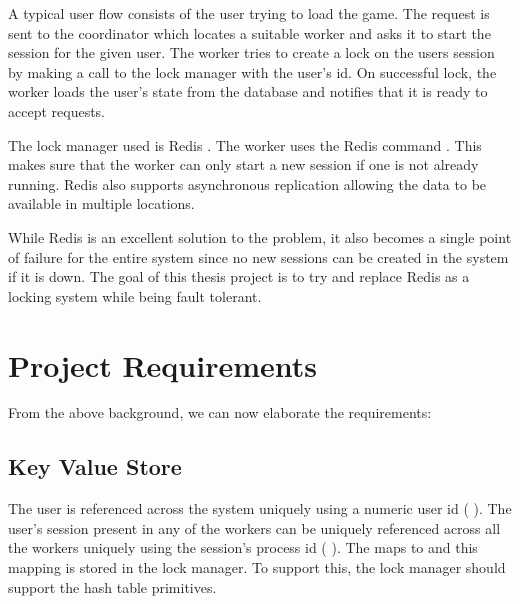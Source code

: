 A typical user flow consists of the user trying to load the game. The request
is sent to the coordinator which locates a suitable worker and asks it to
start the session for the given user. The worker tries to create a lock on
the users session by making a call to the lock manager with the user's id.
On successful lock, the worker loads the user's state from the database and
notifies that it is ready to accept requests.

The lock manager used is Redis \citep{redis}%
. The worker uses the Redis command %
. This makes sure that the worker can only start a new session if one is
not already running. Redis also supports asynchronous replication allowing the
data to be available in multiple locations.

While Redis is an excellent solution to the problem, it also becomes a single
point of failure for the entire system since no new sessions can be created in
the system if it is down. The goal of this thesis project is to try and replace
Redis as a locking system while being fault tolerant.

\section{Project Requirements}

From the above background, we can now elaborate the requirements:

\subsection{Key Value Store}
\label{section:ml.kv.store}


The user is referenced across the system uniquely using a numeric user id
(%
). The user's session present in any of the workers can be uniquely 
referenced across all the workers uniquely using the session's process id
(%
).
The  maps to  and this mapping is stored in the lock
manager. To support this, the lock manager should support the hash
table primitives.

